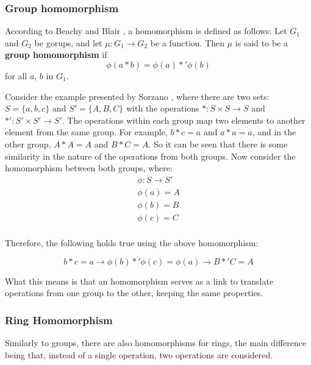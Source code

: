 \subsubsection{Group homomorphism}

According to Beachy and Blair \cite{beachy2006abstract}, a homomorphism is defined as follows: Let $G_{1}$ and $G_{2}$ be gorups, and let $\mu: G_{1} \rightarrow G_{2}$ be a function. Then $\mu$ is said to be a \textbf{group homomorphism} if
\begin{equation}
\phi(a*b) = \phi(a) *' \phi(b)
\end{equation}
for all $a$, $b$ in $G_{1}$.

Consider the example presented by Sorzano \cite{sorzano2013}, where there are two sets: $S= \{a, b, c\}$ and $S' = \{A, B, C\}$  with the operations $*: S \times S \rightarrow S$ and $*' : S' \times S' \rightarrow S'$. The operations within each group map two elements to another element from the same group. For example, $b*c=a$ and $a*a=a$, and in the other group, $A*A = A$ and $B*C=A$. So it can be seen that there is some similarity in the nature of the operations from both groups. Now consider the homomorphism between both groups, where:
\begin{equation}
\begin{split}
  \phi: S \rightarrow S' \\
  \phi(a) = A \\
  \phi(b) = B \\
  \phi(c) = C \\
\end{split}
\end{equation}

Therefore, the following holds true using the above homomorphism:

\begin{equation}
b*c=a \rightarrow \phi(b) *' \phi(c) = \phi(a) \rightarrow B *' C = A
\end{equation}

What this means is that an homomorphism serves as a link to translate operations from one group to the other, keeping the same properties.

\subsubsection{Ring Homomorphism}

Similarly to groups, there are also homomorphisms for rings, the main difference being that, instead of a single operation, two operations are considered.


